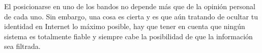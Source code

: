 El posicionarse en uno de los bandos no depende más que de la opinión
personal de cada uno. Sin embargo, una cosa es cierta y es que aún
tratando de ocultar tu identidad en Internet lo máximo posible, hay
que tener en cuenta que ningún sistema es totalmente fiable y siempre
cabe la posibilidad de que la información sea filtrada.
